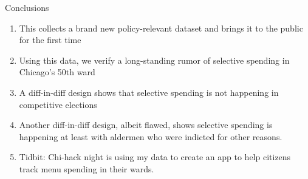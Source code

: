\begin{frame}{Conclusions}
    \begin{enumerate}
        \item This collects a brand new policy-relevant dataset and brings it to the public for the first time
        \item Using this data, we verify a long-standing rumor of selective spending in Chicago's 50th ward
        \item A diff-in-diff design shows that selective spending is not happening in competitive elections
        \item Another diff-in-diff design, albeit flawed, shows selective spending is happening at least with aldermen who were indicted for other reasons.
        \item Tidbit: Chi-hack night is using my data to create an app to help citizens track menu spending in their wards.
    \end{enumerate}
    \end{frame}
